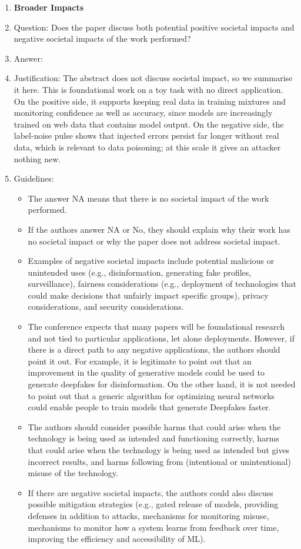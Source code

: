 \begin{enumerate}
\item {\bf Broader Impacts}
    \item[] Question: Does the paper discuss both potential positive societal impacts and negative societal impacts of the work performed?
    \item[] Answer: \answerNo{}
    \item[] Justification: The abstract does not discuss societal impact, so we summarise it here. This is foundational work on a toy task with no direct application. On the positive side, it supports keeping real data in training mixtures and monitoring confidence as well as accuracy, since models are increasingly trained on web data that contains model output. On the negative side, the label-noise pulse shows that injected errors persist far longer without real data, which is relevant to data poisoning; at this scale it gives an attacker nothing new.
    \item[] Guidelines:
    \begin{itemize}
        \item The answer NA means that there is no societal impact of the work performed.
        \item If the authors answer NA or No, they should explain why their work has no societal impact or why the paper does not address societal impact.
        \item Examples of negative societal impacts include potential malicious or unintended uses (e.g., disinformation, generating fake profiles, surveillance), fairness considerations (e.g., deployment of technologies that could make decisions that unfairly impact specific groups), privacy considerations, and security considerations.
        \item The conference expects that many papers will be foundational research and not tied to particular applications, let alone deployments. However, if there is a direct path to any negative applications, the authors should point it out. For example, it is legitimate to point out that an improvement in the quality of generative models could be used to generate deepfakes for disinformation. On the other hand, it is not needed to point out that a generic algorithm for optimizing neural networks could enable people to train models that generate Deepfakes faster.
        \item The authors should consider possible harms that could arise when the technology is being used as intended and functioning correctly, harms that could arise when the technology is being used as intended but gives incorrect results, and harms following from (intentional or unintentional) misuse of the technology.
        \item If there are negative societal impacts, the authors could also discuss possible mitigation strategies (e.g., gated release of models, providing defenses in addition to attacks, mechanisms for monitoring misuse, mechanisms to monitor how a system learns from feedback over time, improving the efficiency and accessibility of ML).
    \end{itemize}


\end{enumerate}
